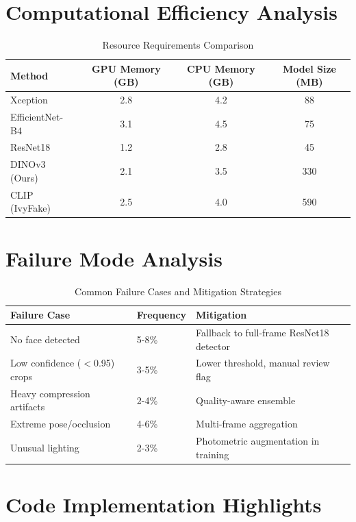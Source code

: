 \documentclass[11pt,a4paper]{article}
\begin{document}
\section{Computational Efficiency Analysis}

\begin{table}[h]
\centering
\caption{Resource Requirements Comparison}
\begin{tabular}{lccc}
\toprule
\textbf{Method} & \textbf{GPU Memory (GB)} & \textbf{CPU Memory (GB)} & \textbf{Model Size (MB)} \\
\midrule
Xception & 2.8 & 4.2 & 88 \\
EfficientNet-B4 & 3.1 & 4.5 & 75 \\
ResNet18 & 1.2 & 2.8 & 45 \\
DINOv3 (Ours) & 2.1 & 3.5 & 330 \\
CLIP (IvyFake) & 2.5 & 4.0 & 590 \\
\bottomrule
\end{tabular}
\end{table}

\section{Failure Mode Analysis}

\begin{table}[h]
\centering
\caption{Common Failure Cases and Mitigation Strategies}
\begin{tabular}{p{4cm}p{3cm}p{6cm}}
\toprule
\textbf{Failure Case} & \textbf{Frequency} & \textbf{Mitigation} \\
\midrule
No face detected & 5-8\% & Fallback to full-frame ResNet18 detector \\
Low confidence ($<$0.95) crops & 3-5\% & Lower threshold, manual review flag \\
Heavy compression artifacts & 2-4\% & Quality-aware ensemble \\
Extreme pose/occlusion & 4-6\% & Multi-frame aggregation \\
Unusual lighting & 2-3\% & Photometric augmentation in training \\
\bottomrule
\end{tabular}
\end{table}

\section{Code Implementation Highlights}
\end{document}
